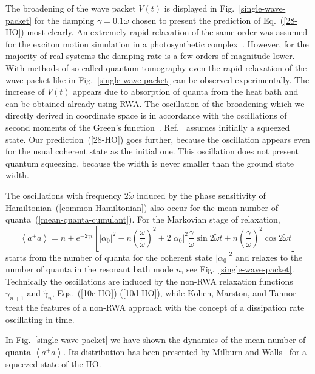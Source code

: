 \documentclass[12pt,twoside,a4paper]{report}
\begin{document}
The broadening of the wave packet $V(t)$ is displayed 
in Fig.~\ref{single-wave-packet}  
for the damping 
$\gamma=0.1\omega$
chosen to present the prediction of Eq.~(\ref{28-HO})
most clearly. An extremely rapid relaxation
 of the same order
was assumed for the exciton motion simulation in a photosynthetic 
complex~\cite{reng96}.
However, for the majority of real systems the damping rate is a few orders of magnitude lower.
With methods of so-called quantum
tomography \cite{schi99} even the rapid relaxation of the wave packet like in 
Fig.~\ref{single-wave-packet}
can be observed experimentally.  
The increase of $V(t)$ appears due to absorption of quanta
from the heat bath and can be obtained
already using RWA. The oscillation of the broadening which we directly derived 
in coordinate space
is in accordance with 
the oscillations of second moments 
of the Green's function~\cite{agar71,21,22}.
Ref.~\cite{22} assumes initially a squeezed state.  Our
prediction~(\ref{28-HO}) goes further, because the oscillation appears even
for the usual coherent state as the initial one.  
This oscillation does not present quantum squeezing, because the
width is never smaller than the ground state width.

The oscillations with frequency $2\tilde \omega$ induced by the phase sensitivity 
of Hamiltonian~(\ref{common-Hamiltonian}) also occur for the mean number of quanta~(\ref{mean-quanta-cumulant}).
For the Markovian stage of relaxation, 
\begin{equation}
\left< a^+ a \right> =
n + e^{-2\gamma t}
\left[ |\alpha_0|^2 -n \left( \frac{\omega}{\tilde \omega} \right)^2+2|\alpha_0|^2\frac{\gamma}{\tilde \omega} \sin{2\tilde \omega t} + n \left( \frac{\gamma}{\tilde \omega} \right)^2 \cos{2\tilde \omega t} \right]
\label{mean-quanta-markov}
\end{equation}
starts from the number of quanta for the coherent state $|\alpha_0|^2$
and relaxes to the number of quanta in the resonant bath mode $n$, see 
Fig.~\ref{single-wave-packet}. 
Technically the oscillations are induced by the non-RWA 
relaxation functions $\tilde \gamma_{n+1}$ and $\tilde \gamma_n$, 
Eqs.~(\ref{10c-HO})-(\ref{10d-HO}), while 
Kohen, Marston, and Tannor \cite{kohe97}
treat the features of a non-RWA approach with the concept of a dissipation rate
oscillating in time.

In Fig.~\ref{single-wave-packet} 
we have shown the dynamics of the mean number of quanta $\left< a^+ a \right>$.
Its distribution has been presented by Milburn
and Walls~\cite{milb88} for a squeezed state of the HO.
\end{document}
